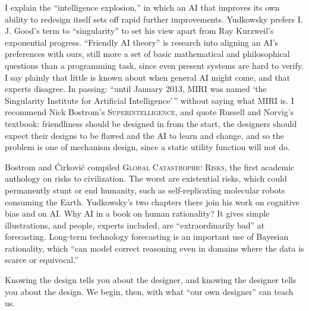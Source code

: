 I explain the ``intelligence explosion,'' in which an AI that improves its own ability to redesign itself sets off rapid further improvements. Yudkowsky prefers I. J. Good's term to ``singularity'' to set his view apart from Ray Kurzweil's exponential progress. ``Friendly AI theory'' is research into aligning an AI's preferences with ours, still more a set of basic mathematical and philosophical questions than a programming task, since even present systems are hard to verify. I say plainly that little is known about when general AI might come, and that experts disagree. In passing: ``until January 2013, MIRI was named `the Singularity Institute for Artificial Intelligence'\,'' without saying what MIRI is.  I recommend Nick Bostrom's \textsc{Superintelligence}, and quote Russell and Norvig's textbook: friendliness should be designed in from the start, the designers should expect their designs to be flawed and the AI to learn and change, and so the problem is one of mechanism design, since a static utility function will not do. 

Bostrom and \'Cirkovi\'c compiled \textsc{Global Catastrophic Risks}, the first academic anthology on risks to civilization. The worst are existential risks, which could permanently stunt or end humanity, such as self-replicating molecular robots consuming the Earth. Yudkowsky's two chapters there join his work on cognitive bias and on AI. Why AI in a book on human rationality? It gives simple illustrations, and people, experts included, are ``extraordinarily bad'' at forecasting.  Long-term technology forecasting is an important use of Bayesian rationality, which ``can model correct reasoning even in domains where the data is scarce or equivocal.'' 

Knowing the design tells you about the designer, and knowing the designer tells you about the design. We begin, then, with what ``our own designer'' can teach us.
